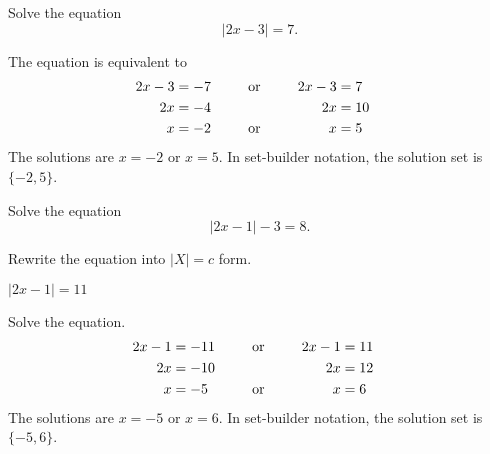 	\begin{multicols}{2}

		\begin{example}
			Solve the equation 
			\[|2x-3|=7.\]
		\end{example}
		\vspace{-0.5\baselineskip}
		\begin{solution}
			The equation is equivalent to
				\begin{alignat*}{3}
					2x-3 & =-7 &  & \ctc{or} & 2x-3 & =7  \\
					2x   & =-4 &  &          & 2x   & =10 \\
					x    & =-2 &  & \ctc{or} & x    & =5
				\end{alignat*}
			The solutions are $x=-2$ or $x=5$. In set-builder notation, the solution set is $\{-2, 5\}$.
		\end{solution}

		\columnbreak


		\begin{example}
			Solve the equation 
			\[|2x-1|-3=8.\]
		\end{example}
		\vspace{-0.5\baselineskip}
		\begin{solution}
			Rewrite the equation into $|X|=c$ form.\\
			\centerline{$|2x-1|=11$}
			Solve the equation.
				\begin{alignat*}{3}
					2x-1 & =-11 &  & \ctc{or} & 2x-1 & =11 \\
					2x   & =-10 &  &          & 2x   & =12 \\
					x    & =-5  &  & \ctc{or} & x    & =6
				\end{alignat*}
			The solutions are $x=-5$ or $x=6$. In set-builder notation, the solution set is $\{-5, 6\}$.
		\end{solution}

	\end{multicols}


